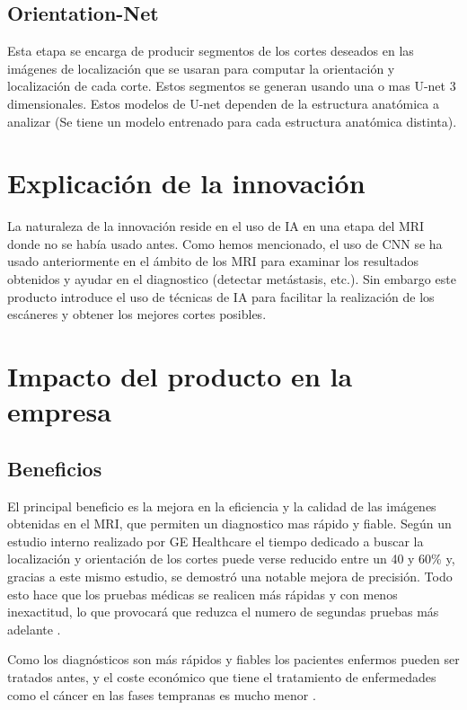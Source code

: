    \subsection{Orientation-Net}
    
    Esta etapa se encarga de producir segmentos de los cortes deseados en las imágenes de localización que se usaran para computar
    la orientación y localización de cada corte. Estos segmentos se generan usando una o mas U-net 3 dimensionales.
    Estos modelos de U-net dependen de la estructura anatómica a analizar (Se tiene un modelo entrenado para cada estructura anatómica distinta).
    
\pagebreak
\section{Explicación de la innovación}

La naturaleza de la innovación reside en el uso de IA en una etapa del MRI donde no se había usado antes.
Como hemos mencionado, el uso de CNN se ha usado anteriormente en el ámbito de los MRI para examinar
los resultados obtenidos y ayudar en el diagnostico (detectar metástasis, etc.). Sin embargo
este producto introduce el uso de técnicas de IA para facilitar la realización de los escáneres y
obtener los mejores cortes posibles.

\section{Impacto del producto en la empresa}


    \subsection{Beneficios}
    
    El principal beneficio es la mejora en la eficiencia y la calidad de las imágenes obtenidas en el MRI, que permiten un diagnostico mas rápido y fiable. Según un estudio interno realizado por GE Healthcare el tiempo dedicado a buscar la localización y orientación de los cortes puede verse reducido entre un 40 y 60\% y, gracias a este mismo estudio, se demostró una notable mejora de precisión. Todo esto hace que los pruebas médicas se realicen más rápidas y con menos inexactitud, lo que provocará que reduzca el numero de segundas pruebas más adelante \cite{noauthor_intelligent_nodate}.
    
    Como los diagnósticos son más rápidos y fiables los pacientes enfermos pueden ser tratados antes, y el coste económico que tiene el tratamiento de enfermedades como el cáncer en las fases tempranas es mucho menor \cite{justo_exploring_nodate,noauthor_new_nodate}.
    
